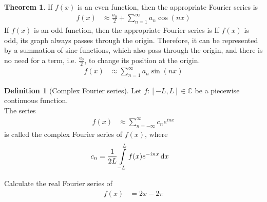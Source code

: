 \documentclass[fleqn, a4paper, 12pt, twoside]{article}
\theoremstyle{definition}
\newtheorem{definition}{Definition}
\theoremstyle{theorem}
\newtheorem{theorem}{Theorem}
\begin{document}
\begin{theorem}
	If $f(x)$ is an even function, then the appropriate Fourier series is
	\begin{align*}
		f(x) & \approx \frac{a_0}{2} + \sum\limits_{n = 1}^{\infty} a_n \cos(n x)
	\end{align*}
	If $f(x)$ is an odd function, then the appropriate Fourier series is
	\marginnote
	{
		If $f(x)$ is odd, its graph always passes through the origin.
		Therefore, it can be represented by a summation of sine functions, which also pass through the origin, and there is no need for a term, i.e. $\frac{a_0}{2}$, to change its position at the origin.
	}
	\begin{align*}
		f(x) & \approx \sum\limits_{n = 1}^{\infty} a_n \sin(n x)
	\end{align*}
\end{theorem}

\begin{definition}[Complex Fourier series]
	Let $f : [-L,L] \in \mathbb{C}$ be a piecewise continuous function.\\
	The series
	\begin{align*}
		f(x) & \approx \sum\limits_{n = -\infty}^{\infty} c_n e^{i n x}
	\end{align*}
	is called the complex Fourier series of $f(x)$, where
	\begin{align*}
		c_n & = \frac{1}{2 L} \int\limits_{-L}^{L} f(x) e^{-i n x} \dif x
	\end{align*}
\end{definition}

\begin{question}
	Calculate the real Fourier series of
	\begin{align*}
		f(x) & = 2 x - 2 \pi
	\end{align*}
\end{question}
\end{document}
